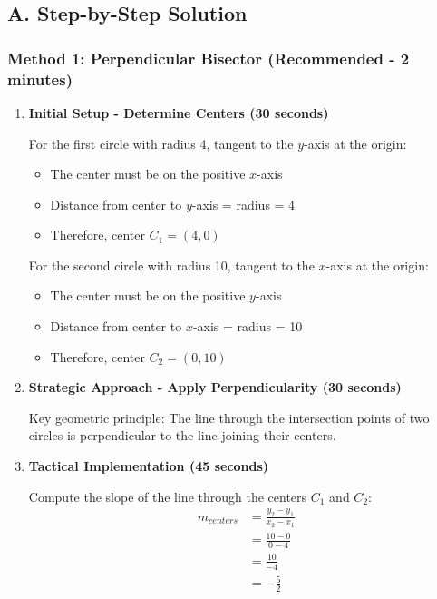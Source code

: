 \documentclass[12pt]{article}
\begin{document}
\begin{solutionbox}
\subsection*{A. Step-by-Step Solution}

\subsubsection*{Method 1: Perpendicular Bisector (Recommended - 2 minutes)}

\begin{enumerate}[leftmargin=*]
    \item \textbf{Initial Setup - Determine Centers (30 seconds)}
    
    For the first circle with radius 4, tangent to the $y$-axis at the origin:
    \begin{itemize}
        \item The center must be on the positive $x$-axis
        \item Distance from center to $y$-axis = radius = 4
        \item Therefore, center $C_1 = (4, 0)$
    \end{itemize}
    
    For the second circle with radius 10, tangent to the $x$-axis at the origin:
    \begin{itemize}
        \item The center must be on the positive $y$-axis  
        \item Distance from center to $x$-axis = radius = 10
        \item Therefore, center $C_2 = (0, 10)$
    \end{itemize}
    
    \item \textbf{Strategic Approach - Apply Perpendicularity (30 seconds)}
    
    Key geometric principle: The line through the intersection points of two circles is perpendicular to the line joining their centers.
    
    \item \textbf{Tactical Implementation (45 seconds)}
    
    Compute the slope of the line through the centers $C_1$ and $C_2$:
    \begin{align*}
        m_{centers} &= \frac{y_2 - y_1}{x_2 - x_1} \\
        &= \frac{10 - 0}{0 - 4} \\
        &= \frac{10}{-4} \\
        &= -\frac{5}{2}
    \end{align*}
    

\end{enumerate}
\end{solutionbox}
\end{document}

